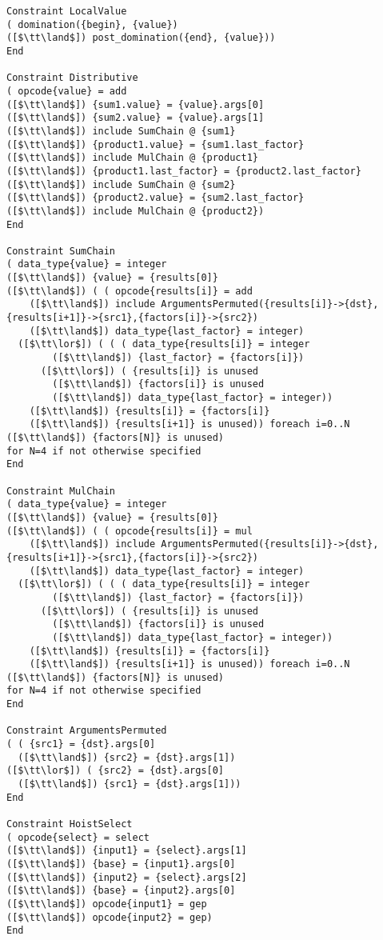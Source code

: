 \begin{lstlisting}[language=CAnDL]
Constraint LocalValue
( domination({begin}, {value})
([$\tt\land$]) post_domination({end}, {value}))
End

Constraint Distributive
( opcode{value} = add
([$\tt\land$]) {sum1.value} = {value}.args[0]
([$\tt\land$]) {sum2.value} = {value}.args[1]
([$\tt\land$]) include SumChain @ {sum1}
([$\tt\land$]) {product1.value} = {sum1.last_factor}
([$\tt\land$]) include MulChain @ {product1}
([$\tt\land$]) {product1.last_factor} = {product2.last_factor}
([$\tt\land$]) include SumChain @ {sum2}
([$\tt\land$]) {product2.value} = {sum2.last_factor}
([$\tt\land$]) include MulChain @ {product2})
End

Constraint SumChain
( data_type{value} = integer
([$\tt\land$]) {value} = {results[0]}
([$\tt\land$]) ( ( opcode{results[i]} = add
    ([$\tt\land$]) include ArgumentsPermuted({results[i]}->{dst},{results[i+1]}->{src1},{factors[i]}->{src2})
    ([$\tt\land$]) data_type{last_factor} = integer)
  ([$\tt\lor$]) ( ( ( data_type{results[i]} = integer
        ([$\tt\land$]) {last_factor} = {factors[i]})
      ([$\tt\lor$]) ( {results[i]} is unused
        ([$\tt\land$]) {factors[i]} is unused
        ([$\tt\land$]) data_type{last_factor} = integer))
    ([$\tt\land$]) {results[i]} = {factors[i]}
    ([$\tt\land$]) {results[i+1]} is unused)) foreach i=0..N
([$\tt\land$]) {factors[N]} is unused)
for N=4 if not otherwise specified
End

Constraint MulChain
( data_type{value} = integer
([$\tt\land$]) {value} = {results[0]}
([$\tt\land$]) ( ( opcode{results[i]} = mul
    ([$\tt\land$]) include ArgumentsPermuted({results[i]}->{dst},{results[i+1]}->{src1},{factors[i]}->{src2})
    ([$\tt\land$]) data_type{last_factor} = integer)
  ([$\tt\lor$]) ( ( ( data_type{results[i]} = integer
        ([$\tt\land$]) {last_factor} = {factors[i]})
      ([$\tt\lor$]) ( {results[i]} is unused
        ([$\tt\land$]) {factors[i]} is unused
        ([$\tt\land$]) data_type{last_factor} = integer))
    ([$\tt\land$]) {results[i]} = {factors[i]}
    ([$\tt\land$]) {results[i+1]} is unused)) foreach i=0..N
([$\tt\land$]) {factors[N]} is unused)
for N=4 if not otherwise specified
End

Constraint ArgumentsPermuted
( ( {src1} = {dst}.args[0]
  ([$\tt\land$]) {src2} = {dst}.args[1])
([$\tt\lor$]) ( {src2} = {dst}.args[0]
  ([$\tt\land$]) {src1} = {dst}.args[1]))
End

Constraint HoistSelect
( opcode{select} = select
([$\tt\land$]) {input1} = {select}.args[1]
([$\tt\land$]) {base} = {input1}.args[0]
([$\tt\land$]) {input2} = {select}.args[2]
([$\tt\land$]) {base} = {input2}.args[0]
([$\tt\land$]) opcode{input1} = gep
([$\tt\land$]) opcode{input2} = gep)
End


\end{lstlisting}
